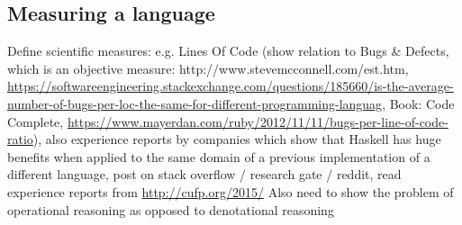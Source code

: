 \subsection{Measuring a language}
Define scientific measures: e.g. Lines Of Code (show relation to Bugs \& Defects, which is an objective measure: http://www.stevemcconnell.com/est.htm, \url{https://softwareengineering.stackexchange.com/questions/185660/is-the-average-number-of-bugs-per-loc-the-same-for-different-programming-languag}, Book: Code Complete, \url{https://www.mayerdan.com/ruby/2012/11/11/bugs-per-line-of-code-ratio}), also experience reports by companies which show that Haskell has huge benefits when applied to the same domain of a previous implementation of a different language, post on stack overflow / research gate / reddit, read experience reports from \url{http://cufp.org/2015/} Also need to show the problem of operational reasoning as opposed to denotational reasoning
